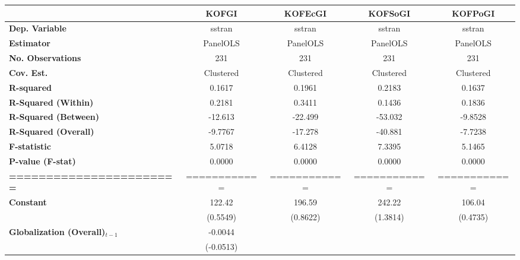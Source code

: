 \begin{center}
\begin{tabular}{lcccc}
\toprule
                                   & \textbf{KOFGI} & \textbf{KOFEcGI} & \textbf{KOFSoGI} & \textbf{KOFPoGI}  \\
\midrule
\textbf{Dep. Variable}             &     sstran     &      sstran      &      sstran      &      sstran       \\
\textbf{Estimator}                 &    PanelOLS    &     PanelOLS     &     PanelOLS     &     PanelOLS      \\
\textbf{No. Observations}          &      231       &       231        &       231        &       231         \\
\textbf{Cov. Est.}                 &   Clustered    &    Clustered     &    Clustered     &    Clustered      \\
\textbf{R-squared}                 &     0.1617     &      0.1961      &      0.2183      &      0.1637       \\
\textbf{R-Squared (Within)}        &     0.2181     &      0.3411      &      0.1436      &      0.1836       \\
\textbf{R-Squared (Between)}       &    -12.613     &     -22.499      &     -53.032      &     -9.8528       \\
\textbf{R-Squared (Overall)}       &    -9.7767     &     -17.278      &     -40.881      &     -7.7238       \\
\textbf{F-statistic}               &     5.0718     &      6.4128      &      7.3395      &      5.1465       \\
\textbf{P-value (F-stat)}          &     0.0000     &      0.0000      &      0.0000      &      0.0000       \\
\textbf{=======================}   &  ============  &   ============   &   ============   &   ============    \\
\textbf{Constant}                     &     122.42     &      196.59      &      242.22      &      106.04       \\
\textbf{ }                         &    (0.5549)    &     (0.8622)     &     (1.3814)     &     (0.4735)      \\
\textbf{Globalization (Overall)$_{t-1}$}               &    -0.0044     &                  &                  &                   \\
\textbf{ }                         &   (-0.0513)    &                  &                  &                   \\

\end{tabular}
\end{center}
